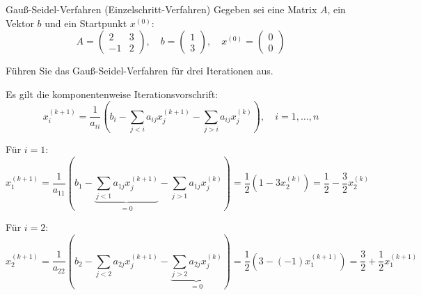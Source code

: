\begin{example}{Gauß-Seidel-Verfahren (Einzelschritt-Verfahren)}
    Gegeben sei eine Matrix $A$, ein Vektor $b$ und ein Startpunkt $x^{(0)}$:
    \[
        A = \begin{pmatrix}
            2  & 3 \\
            -1 & 2
        \end{pmatrix}
        , \quad
        b = \begin{pmatrix}
            1 \\
            3
        \end{pmatrix}
        , \quad
        x^{(0)} = \begin{pmatrix}
            0 \\
            0
        \end{pmatrix}
    \]

    Führen Sie das Gauß-Seidel-Verfahren für drei Iterationen aus.

    \exampleseparator

    Es gilt die komponentenweise Iterationsvorschrift:
    \[
        x_i^{(k+1)} = \frac{1}{a_{ii}} \left( b_i - \sum_{j < i} a_{ij} x_j^{(k+1)} - \sum_{j > i} a_{ij} x_j^{(k)} \right), \quad i = 1, \ldots, n
    \]

    Für $i = 1$:
    \[
        x_1^{(k+1)} = \frac{1}{a_{11}} \left( b_1 - \underbrace{\sum_{j < 1} a_{1j} x_j^{(k+1)}}_{= 0} - \sum_{j > 1} a_{1j} x_j^{(k)} \right) = \frac{1}{2} \left( 1 - 3 x_2^{(k)} \right) = \frac{1}{2} - \frac{3}{2} x_2^{(k)}
    \]

    Für $i = 2$:
    \[
        x_2^{(k+1)} = \frac{1}{a_{22}} \left( b_2 - \sum_{j < 2} a_{2j} x_j^{(k+1)} - \underbrace{\sum_{j > 2} a_{2j} x_j^{(k)}}_{= 0} \right) = \frac{1}{2} \left( 3 - (-1) x_1^{(k+1)} \right) = \frac{3}{2} + \frac{1}{2} x_1^{(k+1)}
    \]


\end{example}
